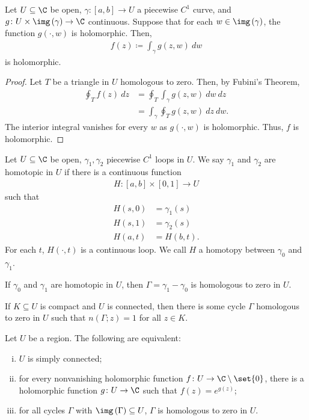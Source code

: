 \documentclass[10pt]{mypackage}
\renewcommand{\coloneq}{\coloneqq}
\begin{document}
\begin{corollary}
  Let $U\subseteq \C$ be open, $\gamma\colon \left[ a,b \right]\rightarrow U$ a piecewise $C^{1}$ curve, and $g\colon U\times \img\left( \gamma \right)\rightarrow \C$ continuous. Suppose that for each $w\in \img\left( \gamma \right)$, the function $g\left( \cdot,w \right)$ is holomorphic. Then,
  \begin{align*}
    f(z)\coloneq \int_{\gamma}^{} g\left( z,w \right)\:dw
  \end{align*}
  is holomorphic.
\end{corollary}
\begin{proof}
  Let $T$ be a triangle in $U$ homologous to zero. Then, by Fubini's Theorem,
  \begin{align*}
    \oint_{T}^{} f(z)\:dz &= \oint_{T}^{} \int_{\gamma}^{} g\left( z,w \right)\:dw\:dz\\
                          &= \int_{\gamma}^{} \oint_{T}^{} g\left( z,w \right)\:dz\:dw.
  \end{align*}
  The interior integral vanishes for every $w$ as $g\left( \cdot,w \right)$ is holomorphic. Thus, $f$ is holomorphic.
\end{proof}
\begin{definition}
  Let $U\subseteq \C$ be open, $\gamma_1,\gamma_2$ piecewise $C^{1}$ loops in $U$. We say $\gamma_1$ and $\gamma_2$ are homotopic in $U$ if there is a continuous function
  \begin{align*}
    H\colon [a,b]\times [0,1]\rightarrow U
  \end{align*}
  such that
  \begin{align*}
    H\left( s,0 \right) &= \gamma_1(s)\\
    H\left( s,1 \right) &= \gamma_2(s)\\
    H\left( a,t \right) &= H\left( b,t \right).
  \end{align*}
  For each $t$, $H\left( \cdot,t \right)$ is a continuous loop. We call $H$ a homotopy between $\gamma_0$ and $\gamma_1$.
\end{definition}
\begin{theorem}
  If $\gamma_0$ and $\gamma_1$ are homotopic in $U$, then $\Gamma = \gamma_1-\gamma_0$ is homologous to zero in $U$.
\end{theorem}
\begin{theorem}
  If $K\subseteq U$ is compact and $U$ is connected, then there is some cycle $\Gamma$ homologous to zero in $U$ such that $n\left( \Gamma;z \right) = 1$ for all $z\in K$.
\end{theorem}
\begin{corollary}
  Let $U$ be a region. The following are equivalent:
  \begin{enumerate}[(i)]
    \item $U$ is simply connected;
    \item for every nonvanishing holomorphic function $f\colon U\rightarrow \C\setminus \set{0}$, there is a holomorphic function $g\colon U\rightarrow \C$ such that $f(z) = e^{g(z)}$;
    \item for all cycles $\Gamma$ with $\img\left( \Gamma \right)\subseteq U$, $\Gamma$ is homologous to zero in $U$.
  \end{enumerate}
\end{corollary}
\end{document}
